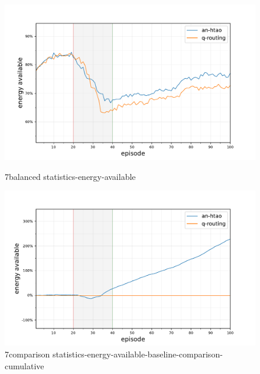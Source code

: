 \begin{figure}[ht]
	\begin{minipage}{.49\textwidth}
		\centering
		\includegraphics[width=1.0\linewidth,trim={25pt 0pt 50pt 0pt},clip]{7balanced_statistics-energy-available}
		\captionsetup{labelfont=bf,singlelinecheck=on}
		\caption{7balanced statistics-energy-available}
		\label{fig:7balanced_statistics-energy-available}
	\end{minipage}
	\begin{minipage}{.49\textwidth}
		\centering
		\includegraphics[width=1.0\linewidth,trim={25pt 0pt 50pt 0pt},clip]{7comparison_statistics-energy-available-baseline-comparison-cumulative}
		\captionsetup{labelfont=bf,singlelinecheck=on}
		\caption{7comparison statistics-energy-available-baseline-comparison-cumulative}
		\label{fig:7comparison_statistics-energy-available-baseline-comparison-cumulative}
	\end{minipage}\hfill%
\end{figure}


